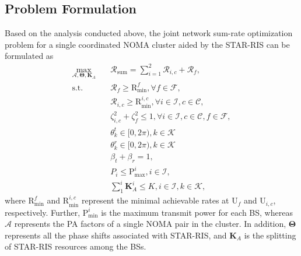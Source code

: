 \documentclass[conference]{IEEEtran}
\begin{document}

\subsection{Problem Formulation}
Based on the analysis conducted above, the joint network sum-rate optimization problem for a single coordinated NOMA cluster aided by the STAR-RIS can be formulated as
\begin{align}
\max_{\mathbf{\mathcal{A}}, \mathbf{\Theta}, \textbf{K}_A} \quad & \mathcal{R}_{\text{sum}}=\sum_{i=1}^{2} \mathcal{R}_{i,c} + \mathcal{R}_{f}, \label{eq:opt} \\
\textrm{s.t.} \quad & \mathcal{R}_f\geq\text{R}_\text{min}^f, \forall f \in \mathcal{F}, \nonumber \\
    \quad & \mathcal{R}_{i, c}\geq\text{R}_\text{min}^{i,c}, \forall i \in \mathcal{I}, c \in \mathcal{C}, \nonumber \\
    \quad & \zeta_{i,c}^2 + \zeta_f^2\leq1, \forall i \in \mathcal{I}, c \in \mathcal{C}, f \in \mathcal{F}, \nonumber \\
    \quad & \theta_k^t\in[0, 2\pi), k \in \mathcal{K} \nonumber \\
    \quad & \theta_k^r\in[0, 2\pi), k \in \mathcal{K} \nonumber \\
    \quad & \beta_t + \beta_r = 1, \nonumber \\
    \quad & P_i \leq \text{P}_\text{max}^i, i \in \mathcal{I}, \nonumber \\
    \quad & \sum_1^i \textbf{K}_A^i \leq K, i \in \mathcal{I}, k \in \mathcal{K}, \nonumber
\end{align}
where $\text{R}_\text{min}^f$ and $\text{R}_\text{min}^{i,c}$ represent the minimal achievable rates at U$_f$ and U$_{i,c}$, respectively. Further, $\text{P}_\text{min}^i$ is the maximum transmit power for each BS, whereas $\mathbf{\mathcal{A}}$ represents the PA factors of a single NOMA pair in the cluster. In addition, $\mathbf{\Theta}$ represents all the phase shifts associated with STAR-RIS, and $\textbf{K}_A$ is the splitting of STAR-RIS resources among the BSs.
\end{document}
